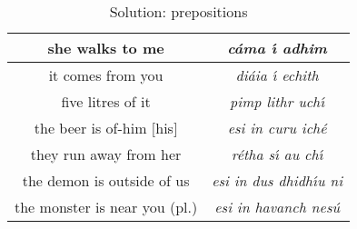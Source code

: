 \begin{table}[H]
{\begin{tabu}{|c|>{\itshape}c|}
  \midrule
  she walks to me & c\'{a}ma \'{\i} adhim\\
  \midrule
  it comes from you & di\'{a}ia \'{\i} echith\\
  \midrule
  five litres of it & pimp lithr uch\'{\i}\\
  \midrule
  the beer is of-him $[$his$]$ & esi in curu ich\'{e}\\
  \midrule
  they run away from her & r\'{e}tha s\'{\i} au ch\'{\i}\\
  \midrule
  the demon is outside of us & esi in dus dhidh\'{\i}u ni\\
  \midrule
  the monster is near you (pl.) & esi in havanch nes\'{u}\\
  \bottomrule
  \end{tabu}
}
\label{solution_prepositions}
\caption{Solution: prepositions}
\end{table}
